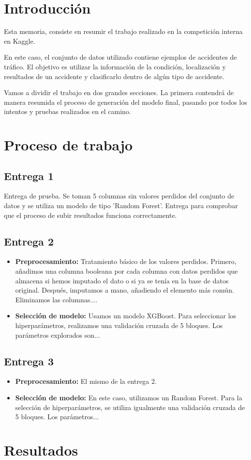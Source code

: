 \section{Introducción}

Esta memoria, consiste en resumir el trabajo realizado en la competición interna en Kaggle. 

En este caso, el conjunto de datos utilizado contiene ejemplos de accidentes de tráfico. El objetivo es utilizar la información de la condición, localización y resultados de un accidente y clasificarlo dentro de algún tipo de accidente.

Vamos a dividir el trabajo en dos grandes secciones. La primera contendrá de manera resumida el proceso de generación del modelo final, pasando por todos los intentos y pruebas realizados en el camino.
\section{Proceso de trabajo}

\subsection{Entrega 1}

Entrega de prueba. Se toman 5 columnas sin valores perdidos del conjunto de datos y se utiliza un modelo de tipo 'Random Forest'. Entrega para comprobar que el proceso de subir resultados funciona correctamente.

\subsection{Entrega 2}
\begin{itemize}
\item \textbf{Preprocesamiento:} Tratamiento básico de los valores perdidos. Primero, añadimos una columna booleana por cada columna con datos perdidos que almacena si hemos imputado el dato o si ya se tenía en la base de datos original. Después, imputamos a mano, añadiendo el elemento más común. Eliminamos las columnas.... 
\item \textbf{Selección de modelo:} Usamos un modelo XGBoost. Para seleccionar los hiperparámetros, realizamos una validación cruzada de 5 bloques. Los parámetros explorados son... 
\end{itemize}

\subsection{Entrega 3}
\begin{itemize}
\item \textbf{Preprocesamiento:} El mismo de la entrega 2.
\item \textbf{Selección de modelo:} En este caso, utilizamos un Random Forest. Para la selección de hiperparámetros, se utiliza igualmente una validación cruzada de 5 bloques. Los parámetros...
\end{itemize}
\section{Resultados}

